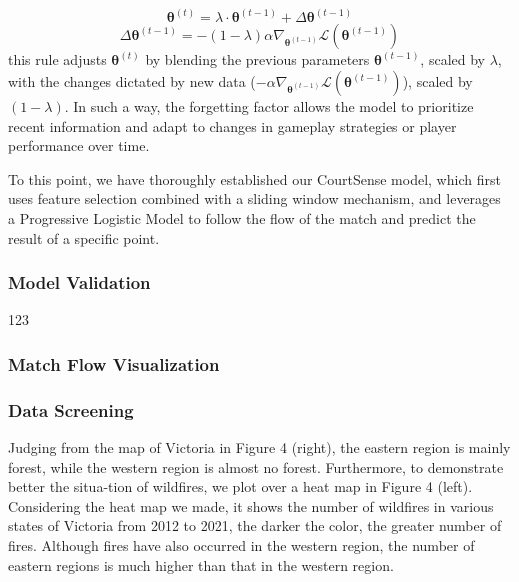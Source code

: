 \documentclass[12pt]{article}  %
\begin{document}
\[
\mathbf{\theta}^{(t)} = \lambda \cdot \mathbf{\theta}^{(t-1)} +  \Delta\mathbf{\theta}^{(t-1)}
\]
\[ 
\Delta\mathbf{\theta}^{(t-1)} = - (1 - \lambda) \alpha \nabla_{\mathbf{\theta}^{(t-1)}} \mathcal{L}(\mathbf{\theta}^{(t-1)})
\]
this rule adjusts $\mathbf{\theta}^{(t)}$ by blending the previous parameters  \( \mathbf{\theta}^{(t-1)} \), scaled by \( \lambda \), with the changes dictated by new data (\( - \alpha \nabla_{\mathbf{\theta}^{(t-1)}} \mathcal{L}(\mathbf{\theta}^{(t-1)}) \)), scaled by $ (1 - \lambda) $. In such a way, the forgetting factor allows the model to prioritize recent information and adapt to changes in gameplay strategies or player performance over time.

To this point, we have thoroughly established our CourtSense model, which first uses feature selection combined with a sliding window mechanism, and leverages a Progressive Logistic Model to follow the flow of the match and predict the result of a specific point.

\subsubsection{Model Validation}
123

\subsubsection{Match Flow Visualization}



\subsubsection{Data Screening}
Judging from the map of Victoria in Figure 4 (right), the eastern region is mainly forest, while the western region is almost no forest. Furthermore, to demonstrate better the situa-tion of wildfires, we plot over a heat map in Figure 4 (left).
Considering the heat map we made, it shows the number of wildfires in various states of Victoria from 2012 to 2021, the darker the color, the greater number of fires. Although fires have also occurred in the western region, the number of eastern regions is much higher than that in the western region. 
\end{document}
